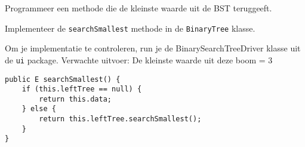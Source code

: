 \begin{oef}
\code Programmeer een methode die de kleinste waarde uit de BST teruggeeft.
\begin{oefenumerate}
	\item Implementeer de \verb=searchSmallest= methode in de \verb=BinaryTree= klasse.  
	\item Om je implementatie te controleren, run je de BinarySearchTreeDriver klasse uit de \verb+ui+ package. Verwachte uitvoer: De kleinste waarde uit deze boom = 3
\end{oefenumerate}
\begin{opl}
\begin{lstlisting}[caption={searchSmallest methode}, label=bstsearchsmallest]
public E searchSmallest() {
	if (this.leftTree == null) {
		return this.data;
	} else {
		return this.leftTree.searchSmallest();
	}
}
\end{lstlisting}
\end{opl}
\end{oef}



